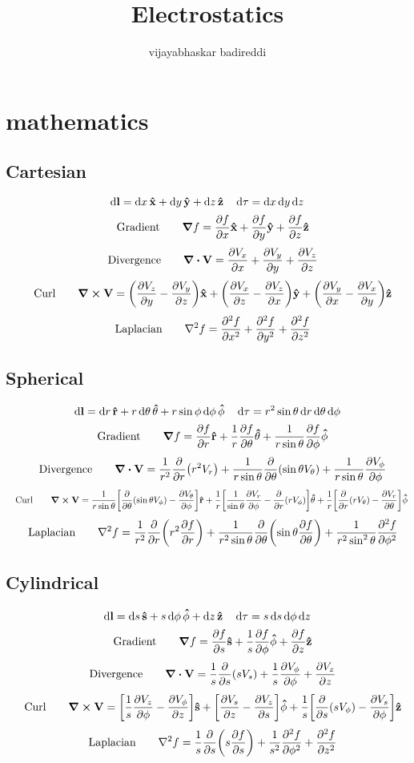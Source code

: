 \documentclass[12pt]{article}
\title{Electrostatics}
\author{vijayabhaskar badireddi}
\begin{document}
\section*{mathematics}
\subsection*{Cartesian}
\[\dd{\vb{l}}=\dd{x}\vu{\vb{x}}+\dd{y}\vu{\vb{y}}+\dd{z}\vu{\vb{z}}\quad\dd{\tau}=\dd{x}\dd{y}\dd{z}\]
\[\qq{Gradient}\quad\grad{f}=\pdv{f}{x}\vu{\vb{x}}+\pdv{f}{y}\vu{\vb{y}}+\pdv{f}{z}\vu{\vb{z}}\]
\[\qq{Divergence}\quad\div{\vb{V}}=\pdv{V_x}{x}+\pdv{V_y}{y}+\pdv{V_z}{z}\]
\[\qq{Curl}\quad\curl{\vb{V}}=\qty(\pdv{V_z}{y}-\pdv{V_y}{z})\vu{\vb{x}}+\qty(\pdv{V_x}{z}-\pdv{V_z}{x})\vu{\vb{y}}+\qty(\pdv{V_y}{x}-\pdv{V_x}{y})\vu{\vb{z}}\]
\[\qq{Laplacian}\quad\laplacian{f}=\pdv[2]{f}{x}+\pdv[2]{f}{y}+\pdv[2]{f}{z}\]
\subsection*{Spherical}
\[\dd{\vb{l}}=\dd{r}\vu{\vb{r}}+r\dd{\theta}\vu{\vb{\theta}}+r\sin\phi\dd{\phi}\vu{\vb{\phi}}\quad\dd{\tau}=r^2\sin\theta\dd{r}\dd{\theta}\dd{\phi}\]
\[\qq{Gradient}\quad\grad{f}=\pdv{f}{r}\vu{\vb{r}}+\frac{1}{r}\pdv{f}{\theta}\vu{\vb{\theta}}+\frac{1}{r\sin\theta}\pdv{f}{\phi}\vu{\vb{\phi}}\]
\[\qq{Divergence}\quad\div{\vb{V}}=\frac{1}{r^2}\pdv{r}\qty(r^2V_r)+\frac{1}{r\sin\theta}\pdv{\theta}\qty(\sin{\theta}V_{\theta})+\frac{1}{r\sin\theta}\pdv{V_{\phi}}{\phi}\]
\[\qq{Curl}\quad\curl{\vb{V}}=\frac{1}{r\sin\theta}\bqty{\pdv{\theta}\qty(\sin{\theta}V_{\phi})-\pdv{V_{\theta}}{\phi}}\vu{\vb{r}}+\frac{1}{r}\bqty{\frac{1}{\sin\theta}\pdv{V_r}{\phi}-\pdv{r}\qty(rV_{\phi})}\vu{\vb{\theta}}+\frac{1}{r}\bqty{\pdv{r}\qty(rV_{\theta})-\pdv{V_r}{\theta}}\vu{\vb{\phi}}\]
\[\qq{Laplacian}\quad\laplacian{f}=\frac{1}{r^2}\pdv{r}\qty(r^2\pdv{f}{r})+\frac{1}{r^2\sin\theta}\pdv{\theta}\qty(\sin{\theta}\pdv{f}{\theta})+\frac{1}{r^2\sin^2{\theta}}\pdv[2]{f}{\phi}\]
\subsection*{Cylindrical}
\[\dd{\vb{l}}=\dd{s}\vu{\vb{s}}+s\dd{\phi}\vu{\vb{\phi}}+\dd{z}\vu{\vb{z}}\quad\dd{\tau}=s\dd{s}\dd{\phi}\dd{z}\]
\[\qq{Gradient}\quad\grad{f}=\pdv{f}{s}\vu{\vb{s}}+\frac{1}{s}\pdv{f}{\phi}\vu{\vb{\phi}}+\pdv{f}{z}\vu{\vb{z}}\]
\[\qq{Divergence}\quad\div{\vb{V}}=\frac{1}{s}\pdv{s}\qty(sV_s)+\frac{1}{s}\pdv{V_{\phi}}{\phi}+\pdv{V_z}{z}\]
\[\qq{Curl}\quad\curl{\vb{V}}=\bqty{\frac{1}{s}\pdv{V_z}{\phi}-\pdv{V_{\phi}}{z}}\vu{\vb{s}}+\bqty{\pdv{V_s}{z}-\pdv{V_z}{s}}\vu{\vb{\phi}}+\frac{1}{s}\bqty{\pdv{s}\qty(sV_{\phi})-\pdv{V_s}{\phi}}\vu{\vb{z}}\]
\[\qq{Laplacian}\quad\laplacian{f}=\frac{1}{s}\pdv{s}\qty(s\pdv{f}{s})+\frac{1}{s^2}\pdv[2]{f}{\phi}+\pdv[2]{f}{z}\]
\end{document}
